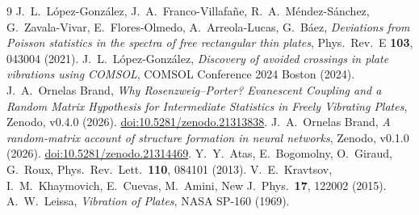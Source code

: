 \documentclass[11pt]{article}
\begin{document}
\begin{thebibliography}{9}
 J.~L.~L\'opez-Gonz\'alez, J.~A.~Franco-Villafa\~ne,
R.~A.~M\'endez-S\'anchez, G.~Zavala-Vivar, E.~Flores-Olmedo,
A.~Arreola-Lucas, G.~B\'aez, \emph{Deviations from Poisson statistics in
the spectra of free rectangular thin plates}, Phys.\ Rev.\ E \textbf{103},
043004 (2021).
 J.~L.~L\'opez-Gonz\'alez, \emph{Discovery of
avoided crossings in plate vibrations using COMSOL}, COMSOL Conference 2024
Boston (2024).
 J.~A.~Ornelas Brand, \emph{Why Rosenzweig--Porter?
Evanescent Coupling and a Random Matrix Hypothesis for Intermediate
Statistics in Freely Vibrating Plates}, Zenodo, v0.4.0 (2026).
\href{https://doi.org/10.5281/zenodo.21313838}{doi:10.5281/zenodo.21313838}.
 J.~A.~Ornelas Brand, \emph{A random-matrix
account of structure formation in neural networks}, Zenodo, v0.1.0
(2026).
\href{https://doi.org/10.5281/zenodo.21314469}{doi:10.5281/zenodo.21314469}.
 Y.~Y.~Atas, E.~Bogomolny, O.~Giraud, G.~Roux,
Phys.\ Rev.\ Lett.\ \textbf{110}, 084101 (2013).
 V.~E.~Kravtsov, I.~M.~Khaymovich, E.~Cuevas,
M.~Amini, New J.\ Phys.\ \textbf{17}, 122002 (2015).
 A.~W.~Leissa, \emph{Vibration of Plates}, NASA SP-160
(1969).
\end{thebibliography}
\end{document}
